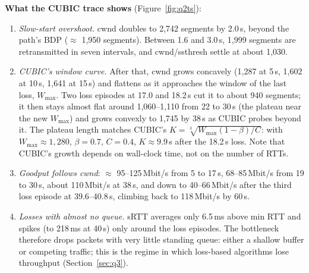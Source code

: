 \documentclass[10pt]{article}
\begin{document}
\textbf{What the CUBIC trace shows} (Figure~\ref{fig:q2ts}):
\begin{enumerate}
\item \emph{Slow-start overshoot.} cwnd doubles to 2,742 segments by 2.0\,s, beyond the path's BDP ($\approx$ 1,950 segments). Between 1.6 and 3.0\,s, 1,999 segments are retransmitted in seven intervals, and cwnd/ssthresh settle at about 1,030.
\item \emph{CUBIC's window curve.} After that, cwnd grows concavely (1,287 at 5\,s, 1,602 at 10\,s, 1,641 at 15\,s) and flattens as it approaches the window of the last loss, $W_{\max}$. Two loss episodes at 17.0 and 18.2\,s cut it to about 940 segments; it then stays almost flat around 1,060--1,110 from 22 to 30\,s (the plateau near the new $W_{\max}$) and grows convexly to 1,745 by 38\,s as CUBIC probes beyond it. The plateau length matches CUBIC's $K = \sqrt[3]{W_{\max}(1-\beta)/C}$: with $W_{\max} \approx 1{,}280$, $\beta = 0.7$, $C = 0.4$, $K \approx 9.9$\,s after the 18.2\,s loss. Note that CUBIC's growth depends on wall-clock time, not on the number of RTTs.
\item \emph{Goodput follows cwnd}: $\approx$ 95--125\,Mbit/s from 5 to 17\,s, 68--85\,Mbit/s from 19 to 30\,s, about 110\,Mbit/s at 38\,s, and down to 40--66\,Mbit/s after the third loss episode at 39.6--40.8\,s, climbing back to 118\,Mbit/s by 60\,s.
\item \emph{Losses with almost no queue.} sRTT averages only 6.5\,ms above min RTT and spikes (to 218\,ms at 40\,s) only around the loss episodes. The bottleneck therefore drops packets with very little standing queue: either a shallow buffer or competing traffic; this is the regime in which loss-based algorithms lose throughput (Section~\ref{sec:q3}).
\end{enumerate}
\end{document}
